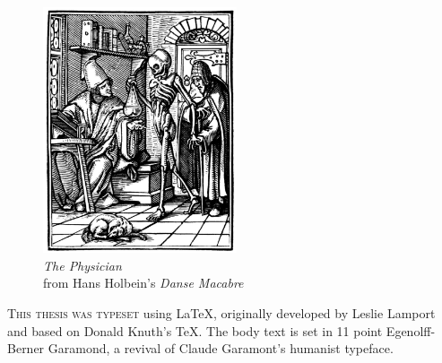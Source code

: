 \newpage

\begin{figure}
    \vspace{50pt}
    \centering
    \includegraphics[width=0.51\textwidth]{endmatter/holbein-physician.jpg}
    \\
    \emph{The Physician}
    \\
    from Hans Holbein's \emph{Danse Macabre}
\end{figure}


\begin{center}
\parbox{200pt}{\lettrine[lines=3,slope=-2pt,nindent=-4pt]{\textcolor{SchoolColor}{T}}{his
thesis was typeset} using \LaTeX, originally developed by Leslie Lamport and
based on Donald Knuth's \TeX. The body text is set in 11 point Egenolff-Berner
Garamond, a revival of Claude Garamont's humanist typeface. }
\end{center}